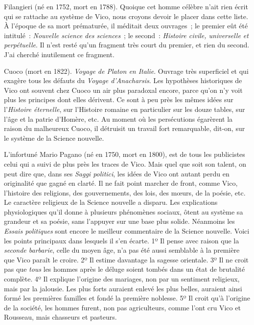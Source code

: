 \documentclass[french,twoside]{book} %
\begin{document}
Filangieri (né en 1752, mort en 1788). Quoique cet homme célèbre n’ait rien écrit qui se rattache au système de Vico, nous croyons devoir le placer dans cette liste. À l’époque de sa mort prématurée, il méditait deux ouvrages ; le premier eût été intitulé : {\itshape Nouvelle science des sciences} ; le second : {\itshape Histoire civile, universelle et perpétuelle}. Il n’est resté qu’un fragment très court du premier, et rien du second. J’ai cherché inutilement ce fragment.\par
Cuoco (mort en 1822). {\itshape Voyage de Platon en Italie}. Ouvrage très superficiel et qui exagère tous les défauts du {\itshape Voyage d’Anacharsis}. Les hypothèses historiques de Vico ont souvent chez Cuoco un air plus paradoxal encore, parce qu’on n’y voit plus les principes dont elles dérivent. Ce sont à peu près les mêmes idées sur l’{\itshape Histoire éternelle}, sur l’Histoire romaine en particulier sur les douze tables, sur l’âge et la patrie d’Homère, etc.  Au moment où les persécutions égarèrent la raison du malheureux Cuoco, il détruisit un travail fort remarquable, dit-on, sur le système de la Science nouvelle.\par
L’infortuné Mario Pagano (né en 1750, mort en 1800), est de tous les publicistes celui qui a suivi de plus près les traces de Vico. Mais quel que soit son talent, on peut dire que, dans ses {\itshape Saggi politici}, les idées de Vico ont autant perdu en originalité que gagné en clarté. Il ne fait point marcher de front, comme Vico, l’histoire des religions, des gouvernements, des lois, des mœurs, de la poésie, etc. Le caractère religieux de la Science nouvelle a disparu. Les explications physiologiques qu’il donne à plusieurs phénomènes sociaux, ôtent au système sa grandeur et sa poésie, sans l’appuyer sur une base plus solide. Néanmoins les {\itshape Essais politiques} sont encore le meilleur commentaire de la Science nouvelle. Voici les points principaux dans lesquels il s’en écarte. 1º Il pense avec raison que la {\itshape seconde barbarie}, celle du moyen âge, n’a pas été aussi semblable à la première que Vico paraît le croire. 2º Il estime davantage la sagesse orientale. 3º Il ne croit pas que {\itshape tous} les hommes après le déluge soient tombés dans un état de brutalité complète. 4º Il explique l’origine des mariages, non par un sentiment religieux, mais par la jalousie. Les plus forts auraient enlevé les plus belles, auraient ainsi formé les premières familles et fondé la première noblesse. 5º Il croit qu’à l’origine de la société, les hommes furent, non pas agriculteurs, comme l’ont cru Vico et Rousseau, mais chasseurs et pasteurs.\par
\end{document}
